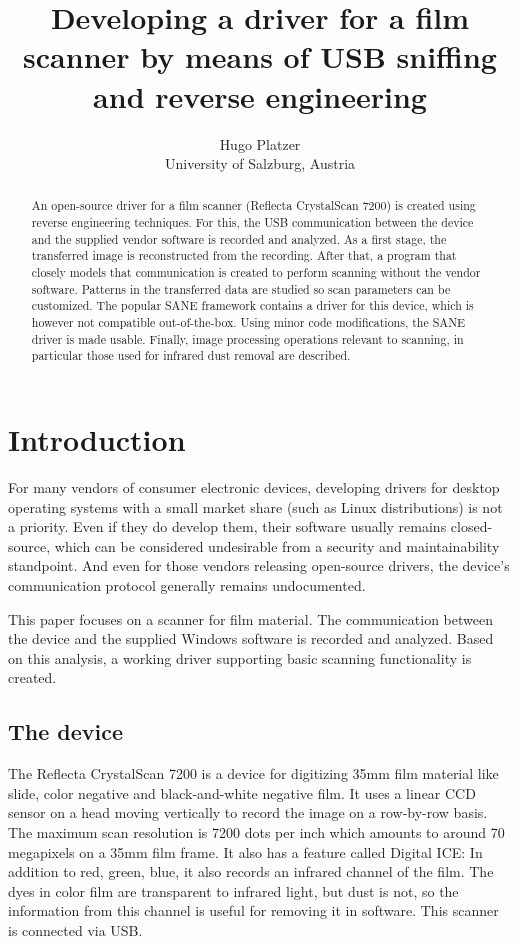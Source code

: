 \documentclass{article}
\begin{document}
\title{Developing a driver for a film scanner by means of USB sniffing and reverse engineering}
\author{Hugo Platzer \\ University of Salzburg, Austria}
\maketitle

\begin{abstract}
An open-source driver for a film scanner (Reflecta CrystalScan 7200) is created using reverse engineering techniques. For this, the USB communication between the device and the supplied vendor software is recorded and analyzed. As a first stage, the transferred image is reconstructed from the recording.  After that, a program that closely models that communication is created to perform scanning without the vendor software. Patterns in the transferred data are studied so scan parameters can be customized.
The popular SANE framework contains a driver for this device, which is however not compatible out-of-the-box.
Using minor code modifications, the SANE driver is made usable. Finally, image processing operations relevant to scanning, in particular those used for infrared dust removal are described.
\end{abstract}

\section{Introduction}

For many vendors of consumer electronic devices,
developing drivers for desktop operating systems
with a small market share (such as Linux distributions) is not a priority. Even if
they do develop them, their software usually remains closed-source, which can be considered undesirable from a security and maintainability standpoint. And even for those
vendors releasing open-source drivers, the device's communication protocol generally remains
undocumented.

This paper focuses on a scanner for film material. The communication between the
device and the supplied Windows software is recorded and analyzed. Based on this analysis,
a working driver supporting basic scanning functionality is created.

\subsection{The device}

The Reflecta CrystalScan 7200 is a device for digitizing 35mm film material like
slide, color negative and black-and-white negative film.
It uses a linear CCD sensor on a head moving vertically to record the image on a row-by-row basis.
The maximum scan resolution is 7200 dots per inch which amounts to around 70 megapixels
on a 35mm film frame. It also has a feature called Digital ICE: In addition to red, green, blue, it also
records an infrared channel of the film. The dyes in color film are transparent to infrared light,
but dust is not, so the information from this channel is useful for removing it in software.
This scanner is connected via USB. \cite{rcs} \cite{rcs_review}
\end{document}
